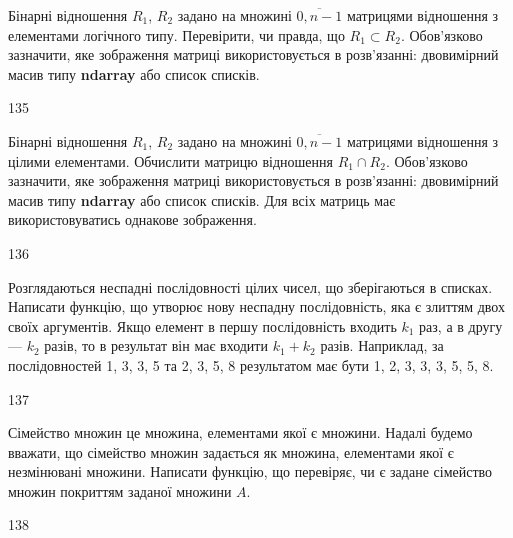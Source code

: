 Бінарні відношення $R_1$, $R_2$ задано на множині $\overline{0,n-1}$ матрицями відношення з елементами логічного типу. Перевірити, чи правда, що $R_1\subset R_2$. Обов'язково зазначити, яке зображення матриці використовується в розв'язанні: двовимірний масив типу \textbf{ndarray} або список списків.
\\\par
135 














Бінарні відношення $R_1$, $R_2$ задано на множині $\overline{0,n-1}$ матрицями відношення з цілими елементами. Обчислити матрицю відношення $R_1\cap R_2$. Обов'язково зазначити, яке зображення матриці використовується в розв'язанні: двовимірний масив типу \textbf{ndarray} або список списків. Для всіх матриць має використовуватись однакове зображення.
\\\par
136 














Розглядаються неспадні послідовності цілих чисел, що зберігаються в списках. Написати функцію, що утворює нову неспадну послідовність, яка є злиттям двох своїх аргументів. Якщо елемент в першу послідовність входить $k_1$ раз, а в другу --- $k_2$ разів, то в результат він має входити $k_1+k_2$ разів. Наприклад, за послідовностей 1, 3, 3, 5 та 2, 3, 5, 8 результатом має бути 1, 2, 3, 3, 3, 5, 5, 8.
\\\par
137 














Сімейство множин це множина, елементами якої є множини. Надалі будемо вважати, що сімейство множин задається як множина, елементами якої є незмінювані множини. Написати функцію, що перевіряє, чи є задане сімейство множин покриттям заданої множини $A$.
\\\par
138 














